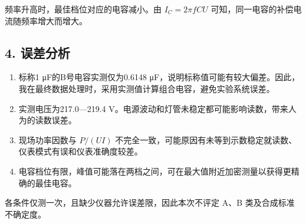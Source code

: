 频率升高时，最佳档位对应的电容减小。由 $I_C=2\pi fCU$ 可知，同一电容的补偿电流随频率增大而增大。


\subsection*{4. 误差分析}

\begin{enumerate}
\item 标称1 μF的B号电容实测仅为0.6148 μF，说明标称值可能有较大偏差。因此，我在最终数据处理时，采用实测值计算组合电容，避免实验系统误差。
\item 实测电压为217.0—219.4 V。电源波动和灯管未稳定都可能影响读数，带来人为的读数误差。
\item 现场功率因数与 $P/(UI)$ 不完全一致，可能原因有未等到示数稳定就读数、仪表模式有误和仪表准确度较差。
\item 电容档位有限，峰值可能落在两档之间，可在最大值附近加密测量以获得更精确的最佳电容。

\end{enumerate}
各条件仅测一次，且缺少仪器允许误差限，因此本次不评定 A、B 类及合成标准不确定度。




